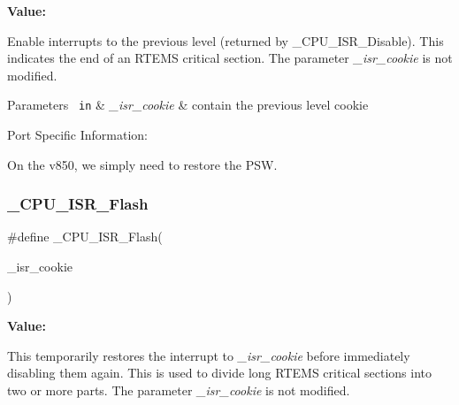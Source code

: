 {\bfseries Value\+:}
\begin{DoxyCode}{0}
\DoxyCodeLine{\textcolor{keywordflow}{do} \{ \(\backslash\)}
\DoxyCodeLine{    \(\backslash\)}

\end{DoxyCode}
Enable interrupts to the previous level (returned by \+\_\+\+C\+P\+U\+\_\+\+I\+S\+R\+\_\+\+Disable). This indicates the end of an R\+T\+E\+MS critical section. The parameter {\itshape \+\_\+isr\+\_\+cookie} is not modified.


\begin{DoxyParams}[1]{Parameters}
\mbox{\texttt{ in}}  & {\em \+\_\+isr\+\_\+cookie} & contain the previous level cookie\\
\hline
\end{DoxyParams}
Port Specific Information\+:

On the v850, we simply need to restore the P\+SW. \mbox{\label{group__RTEMSScoreCPUV850CPUInterrupt_gac7e58e16c6b558daf31fe8f9dbec5a69}} 
\subsubsection{\texorpdfstring{\_CPU\_ISR\_Flash}{\_CPU\_ISR\_Flash}}
{\footnotesize\ttfamily \#define \+\_\+\+C\+P\+U\+\_\+\+I\+S\+R\+\_\+\+Flash(\begin{DoxyParamCaption}\item[{}]{\+\_\+isr\+\_\+cookie }\end{DoxyParamCaption})}

{\bfseries Value\+:}
\begin{DoxyCode}{0}
\DoxyCodeLine{\textcolor{keywordflow}{do} \{ \(\backslash\)}

\end{DoxyCode}
This temporarily restores the interrupt to {\itshape \+\_\+isr\+\_\+cookie} before immediately disabling them again. This is used to divide long R\+T\+E\+MS critical sections into two or more parts. The parameter {\itshape \+\_\+isr\+\_\+cookie} is not modified.



